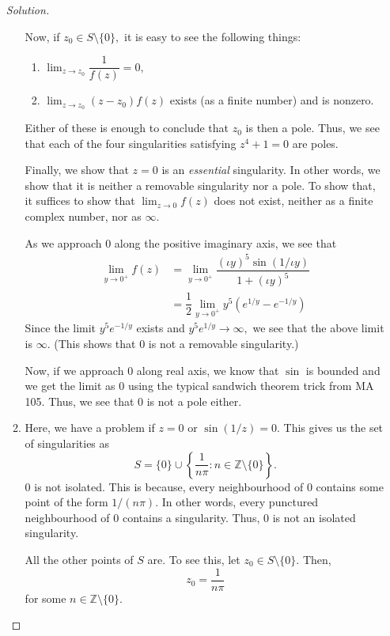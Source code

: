 \documentclass[12pt]{article}
\theoremstyle{definition}
\numberwithin{thm}{section}
\newenvironment{soln}{\begin{proof}[Solution]}{\end{proof}}
\begin{document}
\begin{enumerate}
\begin{soln}
\begin{enumerate}
			Now, if $z_0 \in S\setminus\{0\},$ it is easy to see the following things:
			\begin{enumerate}
				\item $\displaystyle\lim_{z\to z_0}\dfrac{1}{f(z)} = 0,$
				\item $\displaystyle\lim_{z\to z_0}(z - z_0)f(z)$ exists (as a finite number) and is nonzero.
			\end{enumerate}
			Either of these is enough to conclude that $z_0$ is then a pole. Thus, we see that each of the four singularities satisfying $z^4 + 1 = 0$ are poles.

			Finally, we show that $z = 0$ is an \emph{essential} singularity. In other words, we show that it is neither a removable singularity nor a pole. To show that, it suffices to show that $\displaystyle\lim_{z\to 0}f(z)$ does not exist, neither as a finite complex number, nor as $\infty.$

			As we approach $0$ along the positive imaginary axis, we see that
			\begin{align*} 
				\lim_{y\to 0^+}f(z) &= \lim_{y\to 0^+}\dfrac{(\iota y)^5\sin(1/\iota y)}{1 + (\iota y)^5}\\
				&= \dfrac{1}{2}\lim_{y\to 0^+}y^5(e^{1/y} - e^{-1/y})
			\end{align*}
			Since the limit $y^5e^{-1/y}$ exists and $y^5e^{1/y}\to \infty,$ we see that the above limit is $\infty.$ (This shows that $0$ is not a removable singularity.)

			Now, if we approach $0$ along real axis, we know that $\sin$ is bounded and we get the limit as $0$ using the typical sandwich theorem trick from MA 105. Thus, we see that $0$ is not a pole either.
			\item Here, we have a problem if $z = 0$ or $\sin(1/z) = 0.$ This gives us the set of singularities as 
			\begin{equation*} 
				S = \{0\}\cup\left\{\dfrac{1}{n\pi} : n \in \mathbb{Z}\setminus\{0\}\right\}.
			\end{equation*}
			$0$ is not isolated. This is because, every neighbourhood of $0$ contains some point of the form $1/(n\pi).$ In other words, every punctured neighbourhood of $0$ contains a singularity. Thus, $0$ is not an isolated singularity.

			All the other points of $S$ are. To see this, let $z_0 \in S\setminus\{0\}.$ Then, 
			\begin{equation*} 
				z_0 = \dfrac{1}{n\pi}
			\end{equation*}
			for some $n \in \mathbb{Z}\setminus\{0\}.$


\end{enumerate}
\end{soln}
\end{enumerate}
\end{document}
